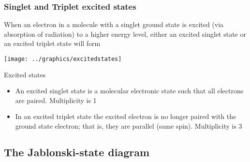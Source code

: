 \documentclass[ignorenonframetext]{beamer}
\begin{document}
\begin{frame}
	\frametitle{Singlet and Triplet excited states}
	When an electron in a molecule with a singlet ground state is excited (via absorption of radiation) to a higher energy level, 		either an excited singlet state or an excited triplet state will form
	\begin{center}
	\texttt{[image: ../graphics/excitedstates]}
	\end{center}
\end{frame}

\begin{frame}
	\begin{alertblock}{Excited states}
	\begin{itemize}
		\item An excited singlet state is a molecular electronic state such that all electrons are paired. Multiplicity is 1
		\item In an excited triplet state the excited electron is no longer paired with the ground state electron; that is, they are 			  parallel (same spin). Multiplicity is 3
	\end{itemize}
	\end{alertblock}
\end{frame}

\subsection{The Jablonski-state diagram}
\end{document}
